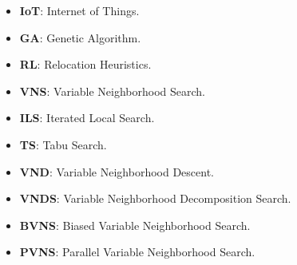 \begin{itemize}
\item \textbf{IoT}: Internet of Things.
\item \textbf{GA}: Genetic Algorithm.
\item \textbf{RL}: Relocation Heuristics.
\item \textbf{VNS}: Variable Neighborhood Search.
\item \textbf{ILS}: Iterated Local Search.
\item \textbf{TS}: Tabu Search.
\item \textbf{VND}: Variable Neighborhood Descent.
\item \textbf{VNDS}: Variable Neighborhood Decomposition Search.
\item \textbf{BVNS}: Biased Variable Neighborhood Search.
\item \textbf{PVNS}: Parallel Variable Neighborhood Search.
\end{itemize} 